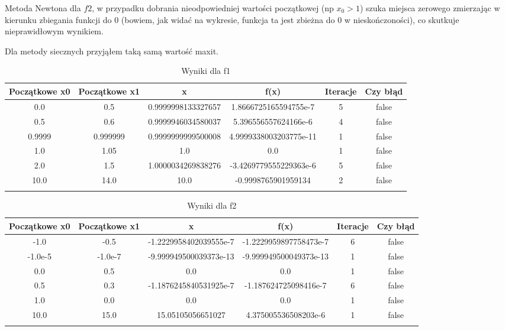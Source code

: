 \documentclass[15pt, a4paper]{article}
\begin{document}
Metoda Newtona dla \(f2\), w przypadku dobrania nieodpowiedniej wartości początkowej (np \(x_0 > 1\)) szuka miejsca zerowego zmierzając w kierunku zbiegania funkcji do 0 (bowiem, jak widać na wykresie, funkcja ta jest zbieżna do 0 w nieskończoności), co skutkuje nieprawidłowym wynikiem. 


\noindent Dla metody siecznych przyjąłem taką samą wartość maxit.


\begin{longtable}{|c|c|c|c|c|c|}
    \hline
    \textbf{Początkowe x0} & \textbf{Początkowe x1} & \textbf{x} & \textbf{f(x)} & \textbf{Iteracje} & \textbf{Czy błąd} \\
    \hline
    0.0 & 0.5 & 0.9999998133327657 & 1.8666725165594755e-7 & 5 & false \\
    \hline
    0.5 & 0.6 & 0.9999946034580037 & 5.396556557624166e-6 & 4 & false \\
    \hline
    0.9999 & 0.999999 & 0.9999999999500008 & 4.9999338003203775e-11 & 1 & false \\
    \hline
    1.0 & 1.05 & 1.0 & 0.0 & 1 & false \\
    \hline
    2.0 & 1.5 & 1.0000034269838276 & -3.4269779555229363e-6 & 5 & false \\
    \hline
    10.0 & 14.0 & 10.0 & -0.9998765901959134 & 2 & false \\
    \hline
    \caption{Wyniki dla f1}

\end{longtable}

\begin{longtable}{|c|c|c|c|c|c|}
    \hline
    \textbf{Początkowe x0} & \textbf{Początkowe x1} & \textbf{x} & \textbf{f(x)} & \textbf{Iteracje} & \textbf{Czy błąd} \\
    \hline
    -1.0 & -0.5 & -1.2229958402039555e-7 & -1.2229959897758473e-7 & 6 & false \\
    \hline
    -1.0e-5 & -1.0e-7 & -9.999949500039373e-13 & -9.999949500049373e-13 & 1 & false \\
    \hline
    0.0 & 0.5 & 0.0 & 0.0 & 1 & false \\
    \hline
    0.5 & 0.3 & -1.1876245840531925e-7 & -1.187624725098416e-7 & 6 & false \\
    \hline
    1.0 & 0.0 & 0.0 & 0.0 & 1 & false \\
    \hline
    10.0 & 15.0 & 15.05105056651027 & 4.375005536508203e-6 & 1 & false \\
    \hline
    \caption{Wyniki dla f2}
\end{longtable}
\end{document}
